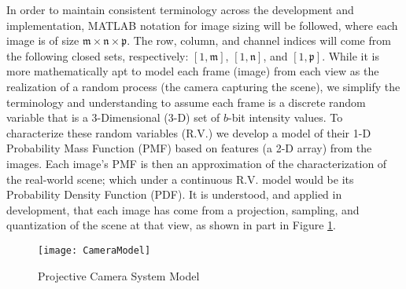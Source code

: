 In order to maintain consistent terminology across the development and implementation, MATLAB\textsuperscript{\textregistered} notation for image sizing will be followed, where each image is of size $\mathfrak{m}\times\mathfrak{n}\times\mathfrak{p}$. The row, column, and channel indices will come from the following closed sets, respectively: $[1,\mathfrak{m}]$, $[1,\mathfrak{n}]$, and $[1,\mathfrak{p}]$. While it is more mathematically apt to model each frame (image) from each view as the realization of a random process (the camera capturing the scene), we simplify the terminology and understanding to assume each frame is a discrete random variable that is a 3-Dimensional (3-D) set of $b$-bit intensity values. To characterize these random variables (R.V.) we develop a model of their 1-D Probability Mass Function (PMF) based on features (a 2-D array) from the images. Each image's PMF is then an approximation of the characterization of the real-world scene; which under a continuous R.V. model would be its Probability Density Function (PDF). It is understood, and applied in development, that each image has come from a projection, sampling, and quantization of the scene at that view, as shown in part in Figure \ref{CameraModel}.

\begin{figure}[!h]
\centering
\texttt{[image: CameraModel]}
\caption{Projective Camera System Model}
\label{CameraModel}
\end{figure}

